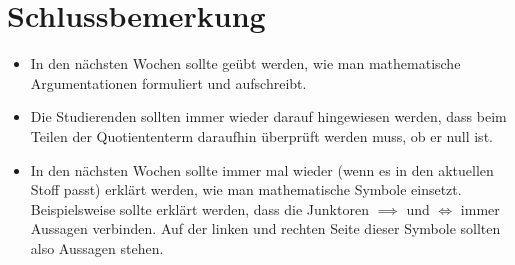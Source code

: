 \documentclass[a4paper]{article}
\begin{document}
\section{Schlussbemerkung}

\begin{itemize}
  \item In den nächsten Wochen sollte geübt werden, wie man mathematische Argumentationen formuliert und aufschreibt.
  \item Die Studierenden sollten immer wieder darauf hingewiesen werden, dass beim Teilen der Quotiententerm daraufhin überprüft werden muss, ob er null ist.
  \item In den nächsten Wochen sollte immer mal wieder (wenn es in den aktuellen Stoff passt) erklärt werden, wie man mathematische Symbole einsetzt. Beispielsweise sollte erklärt werden, dass die Junktoren $\implies$ und $\iff$ immer Aussagen verbinden. Auf der linken und rechten Seite dieser Symbole sollten also Aussagen stehen.
\end{itemize}
\end{document}
